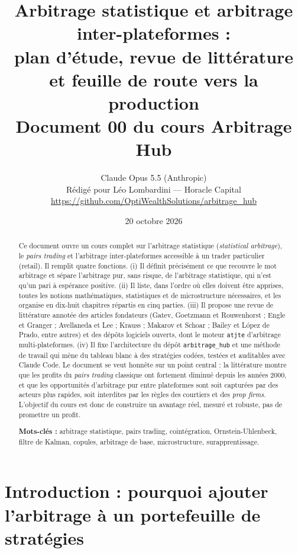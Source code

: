 \documentclass[11pt,a4paper]{article}
\title{\textbf{Arbitrage statistique et arbitrage inter-plateformes :\\ plan d'étude, revue de littérature et feuille de route vers la production}\\[0.4em]
\large Document 00 du cours \og Arbitrage Hub\fg}
\author{Claude Opus 5.5 (Anthropic)\\[0.2em]
\small Rédigé pour Léo Lombardini — Horacle Capital\\
\small\url{https://github.com/OptiWealthSolutions/arbitrage_hub}}
\date{20 octobre 2026}
\begin{document}
\maketitle
\thispagestyle{empty}

\begin{abstract}
\noindent Ce document ouvre un cours complet sur l'arbitrage statistique (\emph{statistical arbitrage}), le \emph{pairs trading} et l'arbitrage inter-plateformes accessible à un trader particulier (\og retail\fg). Il remplit quatre fonctions. (i) Il définit précisément ce que recouvre le mot \og arbitrage\fg{} et sépare l'arbitrage pur, sans risque, de l'arbitrage statistique, qui n'est qu'un pari à espérance positive. (ii) Il liste, dans l'ordre où elles doivent être apprises, toutes les notions mathématiques, statistiques et de microstructure nécessaires, et les organise en dix-huit chapitres répartis en cinq parties. (iii) Il propose une revue de littérature annotée des articles fondateurs (Gatev, Goetzmann et Rouwenhorst ; Engle et Granger ; Avellaneda et Lee ; Krauss ; Makarov et Schoar ; Bailey et López de Prado, entre autres) et des dépôts logiciels ouverts, dont le moteur \texttt{atjte} d'arbitrage multi-plateformes. (iv) Il fixe l'architecture du dépôt \texttt{arbitrage\_hub} et une méthode de travail qui mène du tableau blanc à des stratégies codées, testées et auditables avec Claude Code. Le document se veut honnête sur un point central : la littérature montre que les profits du \emph{pairs trading} classique ont fortement diminué depuis les années 2000, et que les opportunités d'arbitrage \og pur\fg{} entre plateformes sont soit capturées par des acteurs plus rapides, soit interdites par les règles des courtiers et des \emph{prop firms}. L'objectif du cours est donc de construire un avantage réel, mesuré et robuste, pas de promettre un profit.

\medskip\noindent\textbf{Mots-clés :} arbitrage statistique, pairs trading, cointégration, Ornstein-Uhlenbeck, filtre de Kalman, copules, arbitrage de base, microstructure, surapprentissage.
\end{abstract}

\tableofcontents
\newpage

\section{Introduction : pourquoi ajouter l'arbitrage à un portefeuille de stratégies}
\end{document}
